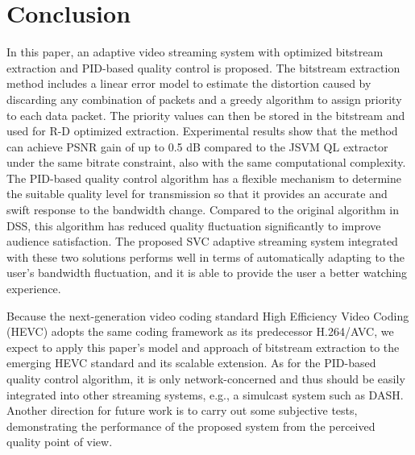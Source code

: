 \documentclass[journal,draftclsnofoot,onecolumn]{IEEEtran}
\begin{document}
\section{Conclusion}
\label{sec:conclusion}

In this paper, an adaptive video streaming system with optimized bitstream extraction and PID-based quality control is proposed. The bitstream extraction method includes a linear error model to estimate the distortion caused by discarding any combination of packets and a greedy algorithm to assign priority to each data packet. The priority values can then be stored in the bitstream and used for R-D optimized extraction. Experimental results show that the method can achieve PSNR gain of up to 0.5 dB compared to the JSVM QL extractor under the same bitrate constraint, also with the same computational complexity. The PID-based quality control algorithm has a flexible mechanism to determine the suitable quality level for transmission so that it provides an accurate and swift response to the bandwidth change. Compared to the original algorithm in DSS, this algorithm has reduced quality fluctuation significantly to improve audience satisfaction. The proposed SVC adaptive streaming system integrated with these two solutions performs well in terms of automatically adapting to the user's bandwidth fluctuation, and it is able to provide the user a better watching experience.

Because the next-generation video coding standard High Efficiency Video Coding (HEVC) \cite{HEVC} adopts the same coding framework as its predecessor H.264/AVC, we expect to apply this paper's model and approach of bitstream extraction to the emerging HEVC standard and its scalable extension. As for the PID-based quality control algorithm, it is only network-concerned and thus should be easily integrated into other streaming systems, e.g., a simulcast system such as DASH. Another direction for future work is to carry out some subjective tests, demonstrating the performance of the proposed system from the perceived quality point of view.

\ifCLASSOPTIONcaptionsoff
  \newpage
\fi



\end{document}
